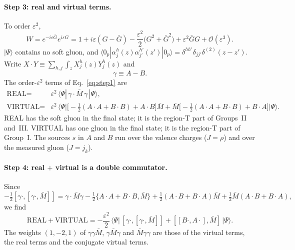 \documentclass[aps,prd,onecolumn,superscriptaddress,nofootinbib,floatfix,longbibliography,11pt]{revtex4-2}
\numberwithin{equation}{section}
\newcommand{\Ord}{\mathcal{O}}
\begin{document}
\paragraph*{Step 3: real and virtual terms.} To order $\varepsilon^2$,
\begin{equation}
W=e^{-i\varepsilon\bar G}e^{i\varepsilon G}=1+i\varepsilon(G-\bar G)-\frac{\varepsilon^2}{2}\big(G^2+\bar G^2\big)+\varepsilon^2\bar GG+\Ord(\varepsilon^3).
\end{equation}
$|\Psi\rangle$ contains no soft gluon, and $\langle0_p|\alpha^h_j(z)\alpha^{h'}_{j'}(z')|0_p\rangle=\delta^{hh'}\delta_{jj'}\delta^{(2)}(z-z')$. Write $X\cdot Y\equiv\sum_{h,j}\int_zX^h_j(z)Y^h_j(z)$ and
\begin{equation}
\gamma\equiv A-B .
\end{equation}
The order-$\varepsilon^2$ terms of Eq.~\eqref{eq:step1} are
\begin{align}
\text{REAL}={}&\varepsilon^2\,\langle\Psi|\,\gamma\cdot\bar M\,\gamma\,|\Psi\rangle,\label{eq:real}\\
\text{VIRTUAL}={}&\varepsilon^2\,\Big\langle\Psi\Big|\Big[-\tfrac12(A\cdot A+B\cdot B)+A\cdot B\Big]\bar M+\bar M\Big[-\tfrac12(A\cdot A+B\cdot B)+B\cdot A\Big]\Big|\Psi\Big\rangle.\label{eq:virt}
\end{align}
REAL has the soft gluon in the final state; it is the region-T part of Groups~II and~III. VIRTUAL has one gluon in the final state; it is the region-T part of Group~I. The sources $s$ in $A$ and $B$ run over the valence charges ($J=\rho$) and over the measured gluon ($J=j_k$).

\paragraph*{Step 4: real $+$ virtual is a double commutator.} Since
\begin{equation}
-\tfrac12[\gamma\cdot,[\gamma\cdot,\bar M]]=\gamma\cdot\bar M\gamma-\tfrac12\{A\cdot A+B\cdot B,\bar M\}+\tfrac12(A\cdot B+B\cdot A)\bar M+\tfrac12\bar M(A\cdot B+B\cdot A),
\end{equation}
we find
\begin{equation}
\text{REAL}+\text{VIRTUAL}=-\frac{\varepsilon^2}{2}\,\Big\langle\Psi\Big|\,[\gamma\cdot,[\gamma\cdot,\bar M]]+[[B\cdot,A\cdot],\bar M]\,\Big|\Psi\Big\rangle .
\label{eq:dc}
\end{equation}
The weights $(1,-2,1)$ of $\gamma\gamma\bar M$, $\gamma\bar M\gamma$ and $\bar M\gamma\gamma$ are those of the virtual terms, the real terms and the conjugate virtual terms.
\end{document}

